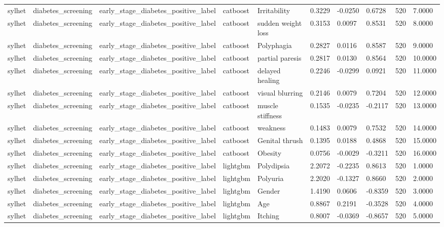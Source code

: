 \begin{tabular}{llllllllll}
sylhet & diabetes\_screening & early\_stage\_diabetes\_positive\_label & catboost & Irritability & 0.3229 & -0.0250 & 0.6728 & 520 & 7.0000 \\
sylhet & diabetes\_screening & early\_stage\_diabetes\_positive\_label & catboost & sudden weight loss & 0.3153 & 0.0097 & 0.8531 & 520 & 8.0000 \\
sylhet & diabetes\_screening & early\_stage\_diabetes\_positive\_label & catboost & Polyphagia & 0.2827 & 0.0116 & 0.8587 & 520 & 9.0000 \\
sylhet & diabetes\_screening & early\_stage\_diabetes\_positive\_label & catboost & partial paresis & 0.2817 & 0.0130 & 0.8564 & 520 & 10.0000 \\
sylhet & diabetes\_screening & early\_stage\_diabetes\_positive\_label & catboost & delayed healing & 0.2246 & -0.0299 & 0.0921 & 520 & 11.0000 \\
sylhet & diabetes\_screening & early\_stage\_diabetes\_positive\_label & catboost & visual blurring & 0.2146 & 0.0079 & 0.7204 & 520 & 12.0000 \\
sylhet & diabetes\_screening & early\_stage\_diabetes\_positive\_label & catboost & muscle stiffness & 0.1535 & -0.0235 & -0.2117 & 520 & 13.0000 \\
sylhet & diabetes\_screening & early\_stage\_diabetes\_positive\_label & catboost & weakness & 0.1483 & 0.0079 & 0.7532 & 520 & 14.0000 \\
sylhet & diabetes\_screening & early\_stage\_diabetes\_positive\_label & catboost & Genital thrush & 0.1395 & 0.0188 & 0.4868 & 520 & 15.0000 \\
sylhet & diabetes\_screening & early\_stage\_diabetes\_positive\_label & catboost & Obesity & 0.0756 & -0.0029 & -0.3211 & 520 & 16.0000 \\
sylhet & diabetes\_screening & early\_stage\_diabetes\_positive\_label & lightgbm & Polydipsia & 2.2072 & -0.2235 & 0.8613 & 520 & 1.0000 \\
sylhet & diabetes\_screening & early\_stage\_diabetes\_positive\_label & lightgbm & Polyuria & 2.2020 & -0.1327 & 0.8660 & 520 & 2.0000 \\
sylhet & diabetes\_screening & early\_stage\_diabetes\_positive\_label & lightgbm & Gender & 1.4190 & 0.0606 & -0.8359 & 520 & 3.0000 \\
sylhet & diabetes\_screening & early\_stage\_diabetes\_positive\_label & lightgbm & Age & 0.8867 & 0.2191 & -0.3528 & 520 & 4.0000 \\
sylhet & diabetes\_screening & early\_stage\_diabetes\_positive\_label & lightgbm & Itching & 0.8007 & -0.0369 & -0.8657 & 520 & 5.0000 \\

\end{tabular}
